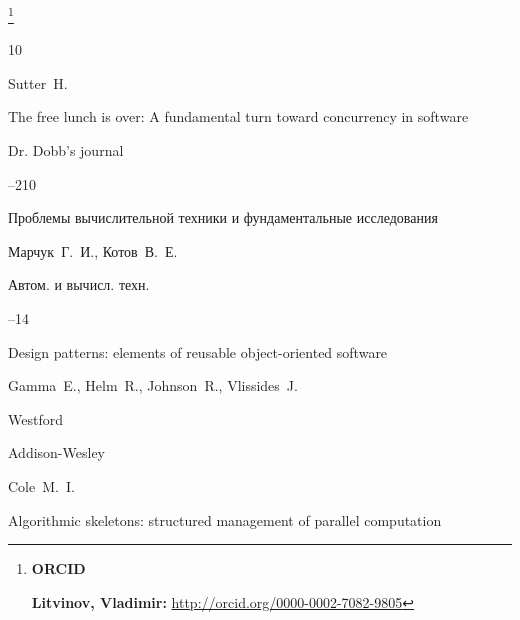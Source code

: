 \thanks{{\bf ORCID}



{\bf Litvinov, Vladimir:} \url{http://orcid.org/0000-0002-7082-9805}

}



\RusRef









\begin{thebibliography}{10}






\by Sutter~H.

\paper The free lunch is over: A fundamental turn toward   concurrency in software

\jour Dr. Dobb’s journal




--210





\paper Проблемы вычислительной техники и фундаментальные   исследования

\by Марчук~Г.~И., Котов~В.~Е.

\jour Автом. и вычисл. техн.



--14




\book Design patterns: elements of reusable object-oriented software

\by Gamma~E., Helm~R., Johnson~R., Vlissides~J.

\publaddr Westford

\publ Addison-Wesley






\by Cole~M.~I.

\book Algorithmic skeletons: structured management of parallel   computation


\end{thebibliography}
